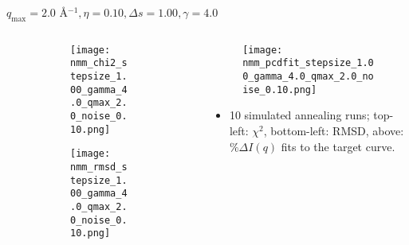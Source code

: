 \documentclass{beamer}
\begin{document}
\begin{frame}{$ q_{\textrm{max}}=2.0 $ \AA $^{-1}, \eta=0.10, \Delta s=1.00, \gamma=4.0$}
	\begin{columns}
		\begin{column}{.5\textwidth}
			\begin{figure}[H]
			\centering
			\begin{subfigure}[b]{\textwidth}
				\centering
				\texttt{[image: nmm\_chi2\_stepsize\_1.00\_gamma\_4.0\_qmax\_2.0\_noise\_0.10.png]}
				\label{fig:}
			\end{subfigure}
			\begin{subfigure}[b]{\textwidth}
				\centering
				\texttt{[image: nmm\_rmsd\_stepsize\_1.00\_gamma\_4.0\_qmax\_2.0\_noise\_0.10.png]}
				\label{fig:}
			\end{subfigure}
			\end{figure}
		\end{column}
		\begin{column}{.5\textwidth}
			\begin{figure}[H]
				\centering
				\texttt{[image: nmm\_pcdfit\_stepsize\_1.00\_gamma\_4.0\_qmax\_2.0\_noise\_0.10.png]}
				\label{fig:}
			\end{figure}
			\begin{itemize}
				\item 10 simulated annealing runs; top-left: $\chi^2$, bottom-left: RMSD, above: $\%\Delta I(q)$ fits to the target curve.
			\end{itemize}
		\end{column}
	\end{columns}
\end{frame}
 
\end{document}
